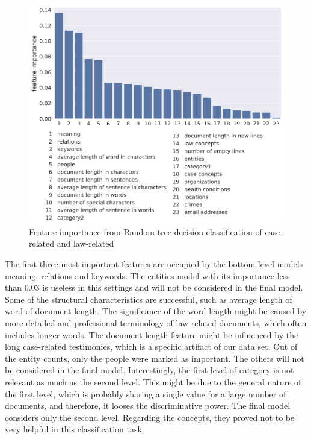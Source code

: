 \documentclass[
  digital, %
  notable,   %
  nolof,     %
  nolot,     %
  draft
]{fithesis3}
\begin{document}
\begin{figure}[h]
\caption{Feature importance from Random tree decision classification of case-related and law-related}
\label{fig:case_law_feature_importance}
\includegraphics[width=\textwidth]{img/case_law_feature_importance}
\end{figure}

The first three most important features are occupied by the bottom-level models meaning, relations and keywords.
The entities model with its importance less than $0.03$ is useless in this settings and will not be considered in the final model.
Some of the structural characteristics are successful, such as average length of word of document length.
The significance of the word length might be caused by more detailed and professional terminology of law-related documents, which often includes longer words.
The document length feature might be influenced by the long case-related testimonies, which is a specific artifact of our data set.
Out of the entity counts, only the people were marked as important.
The others will not be considered in the final model.
Interestingly, the first level of category is not relevant as much as the second level.
This might be due to the general nature of the first level, which is probably sharing a single value for a large number of documents, and therefore, it looses the discriminative power.
The final model considers only the second level.
Regarding the concepts, they proved not to be very helpful in this classification task.
\end{document}

